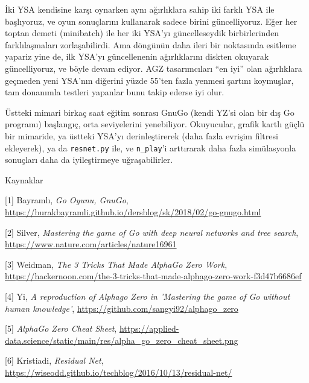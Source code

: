 \documentclass[12pt,fleqn]{article}\usepackage{../../common}
\begin{document}
İki YSA kendisine karşı oynarken aynı ağırlıklara sahip iki farklı YSA ile
başlıyoruz, ve oyun sonuçlarını kullanarak sadece birini
güncelliyoruz. Eğer her toptan demeti (minibatch) ile her iki YSA'yı
güncelleseydik birbirlerinden farklılaşmaları zorlaşabilirdi. Ama döngünün
daha ileri bir noktasında esitleme yapariz yine de, ilk YSA'yı
güncellenenin ağırlıklarını diskten okuyarak güncelliyoruz, ve böyle devam
ediyor. AGZ tasarımcıları ``en iyi'' olan ağırlıklara geçmeden yeni YSA'nın
diğerini yüzde 55'ten fazla yenmesi şartını koymuşlar, tam donanımla
testleri yapanlar bunu takip ederse iyi olur.

Üstteki mimari birkaç saat eğitim sonrası GnuGo (kendi YZ'si olan bir dış
Go programı) başlangıç, orta seviyelerini yenebiliyor. Okuyucular, grafik
kartlı güçlü bir mimaride, ya üstteki YSA'yı derinleştirerek (daha fazla
evrişim filtresi ekleyerek), ya da \verb!resnet.py! ile, ve \verb!n_play!'i
arttırarak daha fazla simülasyonla sonuçları daha da iyileştirmeye
uğraşabilirler.

Kaynaklar

[1] Bayramlı, 
    {\em Go Oyunu, GnuGo}, 
    \url{https://burakbayramli.github.io/dersblog/sk/2018/02/go-gnugo.html}

[2] Silver, {\em Mastering the game of Go with deep neural networks and tree search}, \url{https://www.nature.com/articles/nature16961}

[3] Weidman, {\em The 3 Tricks That Made AlphaGo Zero Work}, \url{https://hackernoon.com/the-3-tricks-that-made-alphago-zero-work-f3d47b6686ef}

[4] Yi, {\em A reproduction of Alphago Zero in 'Mastering the game of Go without human knowledge'}, \url{https://github.com/sangyi92/alphago_zero}

[5] {\em AlphaGo Zero Cheat Sheet}, \url{https://applied-data.science/static/main/res/alpha_go_zero_cheat_sheet.png}

[6] Kristiadi, {\em Residual Net}, \url{https://wiseodd.github.io/techblog/2016/10/13/residual-net/}
\end{document}
